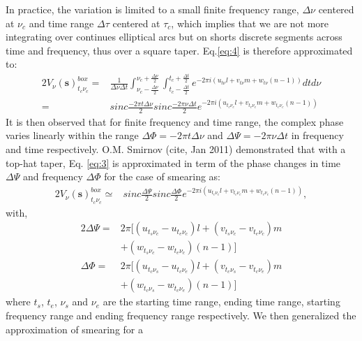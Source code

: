 In practice, the variation is limited to a small finite frequency range, $\Delta \nu$ centered at $\nu_c$ and time range $\Delta \tau$ centered
at $\tau_c$, which implies that we are not more integrating over continues elliptical arcs but on shorts discrete
segments across time and frequency, thus over a square taper. Eq.\ref{eq:4} is therefore approximated to:
\begin{alignat}{2}
V_{\nu}(\mathbf{s})^{box}_{t_c \nu_c} =& \frac{1}{\Delta \nu \Delta t}\int_{\nu_c - \frac{\Delta \nu}{2}}^{\nu_c + \frac{\Delta \nu}{2}}\int_{t_c - \frac{\Delta t}{2}}^{t_c + \frac{\Delta t}{2}}
 e^{-2\pi i (u_{t\nu}l+v_{t\nu}m+w_{t\nu}(n-1))}dt d\nu\\
					 =&sinc\frac{-2\pi t\Delta \nu}{2}sinc\frac{-2\pi\nu\Delta t}{2}e^{-2\pi i (u_{t_c\nu_c}l+v_{t_c\nu_c}m+w_{t_c\nu_c}(n-1))}\label{eq:5}
\end{alignat}
It is then observed that for finite frequency and time range, the complex phase varies linearly within the range
$\Delta \Phi = −2\pi t\Delta \nu$ and $\Delta \Psi= −2\pi\nu\Delta t$ in frequency and time respectively.
O.M. Smirnov (cite, Jan 2011) demonstrated that with a top-hat taper, Eq. \ref{eq:3} is approximated in term of the
phase changes in time $\Delta \Psi$ and frequency  $\Delta \Phi$ for the case
of smearing as:
\begin{alignat}{2}
V_{\nu}(\mathbf{s})^{box}_{t_c \nu_c} \simeq &  sinc\frac{\Delta \Psi}{2}sinc\frac{\Delta \Phi}{2}e^{-2\pi i (u_{t_c\nu_c}l+v_{t_c\nu_c}m+w_{t_c\nu_c}(n-1))}\label{eq:6},
\end{alignat}
with,
\begin{alignat*}{2}
\Delta \Psi =&2\pi \Big[(u_{t_s\nu_c}-u_{t_e\nu_c})l + (v_{t_s\nu_c}-v_{t_e\nu_c})m\\
	    & +(w_{t_s\nu_c}-w_{t_e\nu_c})(n-1)\Big]\\
\Delta \Phi =&2\pi \Big[(u_{t_c\nu_s}-u_{t_c\nu_e})l + (v_{t_c\nu_s}-v_{t_c\nu_e})m\\
	    & +(w_{t_c\nu_s}-w_{t_c\nu_e})(n-1)\Big]
\end{alignat*}
where $t_s$, $t_e$, $\nu_s$ and $\nu_e$ are the starting time range, ending time range, starting frequency range and ending frequency
range respectively.
We then generalized the approximation of smearing for a
